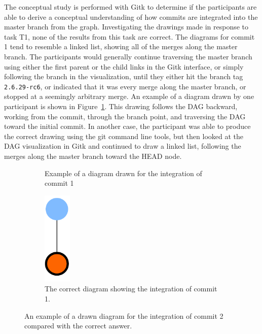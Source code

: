 The conceptual study is performed with Gitk to determine if the
participants are able to derive a conceptual understanding
of how commits are integrated into the master branch from the graph.
Investigating the drawings made in response to task T1, none of the
results from this task are correct. The diagrams for commit 1 tend to
resemble a linked list, showing all of the merges along the master
branch. The participants would generally continue traversing the master
branch using either the first parent or the child links in the Gitk
interface, or simply following the branch in the visualization, until
they either hit the branch tag \verb|2.6.29-rc6|, or indicated that it
was every merge along the master branch, or stopped at a seemingly
arbitrary merge. An example of a diagram drawn by one participant is
shown in Figure~\ref{fig:commit_1_fig}. This drawing follows the DAG
backward, working from the commit, through the branch point, and
traversing the DAG toward the initial commit. In another case, the
participant was able to produce the correct drawing using the git
command line tools, but then looked at the DAG visualization in Gitk and
continued to draw a linked list, following the merges along the master
branch toward the HEAD node.

\begin{figure}[htpb]
  \centering
  \begin{subfigure}[b]{0.9\textwidth}
    \centering
  \caption{Example of a diagram drawn for the integration of commit 1}
  \label{fig:commit_1_fig}
  \end{subfigure}

  \begin{subfigure}[b]{0.9\textwidth}
    \includegraphics[height=4.5cm]{Figures/evaluation/commit1_linvis.pdf}
    \caption{The correct diagram showing the integration of commit 1.}
  \end{subfigure}

  \caption{An example of a drawn diagram for the integration of commit 2
    compared with the correct answer.}

\end{figure}

